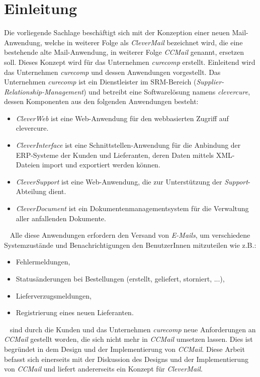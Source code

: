 \chapter{Einleitung}
\label{cha:einleitung}
Die vorliegende Sachlage beschäftigt sich mit der Konzeption einer neuen Mail-Anwendung, welche in weiterer Folge als \emph{CleverMail} bezeichnet wird, die eine bestehende alte Mail-Anwendung, in weiterer Folge \emph{CCMail} genannt, ersetzen soll. Dieses Konzept wird für das Unternehmen \emph{curecomp} erstellt. Einleitend wird das Unternehmen \emph{curecomp} und dessen Anwendungen vorgestellt. 
\newline
\newline
Das Unternehmen \emph{curecomp} ist ein Dienstleister im SRM-Bereich (\emph{Supplier-Relationship-Management}) und betreibt eine Softwarelösung namens \emph{clevercure}, dessen Komponenten aus den folgenden Anwendungen besteht:
\newline
\begin{itemize}
	\item\emph{CleverWeb} ist eine Web-Anwendung für den webbasierten Zugriff auf clevercure.
	\item\emph{CleverInterface} ist eine Schnittstellen-Anwendung für die Anbindung der ERP-Systeme der Kunden und Lieferanten, deren Daten mittels XML-Dateien	import und exportiert werden können.
	\item\emph{CleverSupport} ist eine Web-Anwendung, die zur Unterstützung der \emph{Support}-Abteilung dient.
	\item\emph{CleverDocument} ist ein Dokumentenmanagementsystem für die Verwaltung aller anfallenden Dokumente.
\end{itemize} 
\ \newline
Alle diese Anwendungen erfordern den Versand von \emph{E-Mails}, um verschiedene Systemzustände und Benachrichtigungen den BenutzerInnen mitzuteilen wie z.B.:
\begin{itemize}
	\item Fehlermeldungen,
	\item Statusänderungen bei Bestellungen (erstellt, geliefert, storniert, ...),
	\item Lieferverzugsmeldungen,
	\item Registrierung eines neuen Lieferanten.
\end{itemize}
\ \newpage
{} sind durch die Kunden und das Unternehmen \emph{curecomp} neue Anforderungen an \emph{CCMail} gestellt worden, die sich nicht mehr in \emph{CCMail} umsetzen lassen. Dies ist begründet in dem Design und der Implementierung von \emph{CCMail}. Diese Arbeit befasst sich einerseits mit der Diskussion des Designs und der Implementierung von \emph{CCMail} und liefert andererseits ein Konzept für \emph{CleverMail}.
